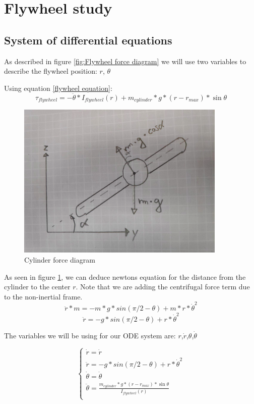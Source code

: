 \section{Flywheel study}

\subsection{System of differential equations}
As described in figure \ref{fig:Flywheel force diagram} we will use two variables to describe the flywheel position: $r$, $\theta$ 

Using equation \ref{flywheel equation}:
\[\tau_{flywheel} = -\ddot{\theta}*I_{flywheel}(r) + m_{cylinder} * g * (r - r_{max}) * \sin{\theta}\]
\begin{figure}[ht]
	\centering
	\includegraphics[width=10cm]{img/cylinder_forces.png}
	\caption{Cylinder force diagram}
	\label{fig:Cylinder force diagram}
\end{figure}

As seen in figure \ref{fig:Cylinder force diagram}, we can deduce newtons equation for the distance from the cylinder to the center $r$. Note that we are adding the centrifugal force term due to the non-inertial frame.
\[\ddot{r} * m = -m * g * sin(\pi/2-\theta) + m * r * \dot{\theta}^2 \]
\[\ddot{r} = -g * sin(\pi/2-\theta) + r * \dot{\theta}^2 \]

The variables we will be using for our ODE system are: $r$,$\dot{r}$,$\theta$,$\dot{\theta}$


\[
\begin{cases}
    \dot{r} = \dot{r}\\
    \ddot{r} = -g * sin(\pi/2-\theta) + r * \dot{\theta}^2\\
    \dot{\theta} = \dot{\theta}\\
    \ddot{\theta} = \frac{m_{cylinder} * g * (r - r_{max}) * \sin{\theta}}{I_{flywheel}(r)} \\    
\end{cases}
\]

